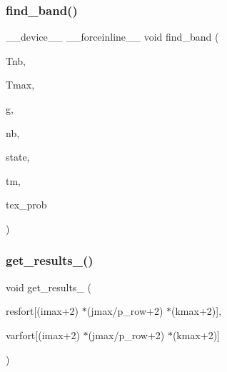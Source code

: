 \subsubsection{\texorpdfstring{find\+\_\+band()}{find\_band()}}
{\footnotesize\ttfamily \+\_\+\+\_\+device\+\_\+\+\_\+ \+\_\+\+\_\+forceinline\+\_\+\+\_\+ void find\+\_\+band (\begin{DoxyParamCaption}\item[{\hyperlink{param_8h_a5f097c9f3873af7be7fc156e6a06ca5e}{myfloat} $\ast$}]{Tnb,  }\item[{\hyperlink{param_8h_a5f097c9f3873af7be7fc156e6a06ca5e}{myfloat}}]{Tmax,  }\item[{int $\ast$}]{g,  }\item[{int $\ast$}]{nb,  }\item[{curand\+State\+\_\+t $\ast$}]{state,  }\item[{int}]{tm,  }\item[{cuda\+Texture\+Object\+\_\+t $\ast$}]{tex\+\_\+prob }\end{DoxyParamCaption})}

\mbox{\label{mc__gpu_8cu_afd9f6194553240239ec004db3c16acec}} 
\subsubsection{\texorpdfstring{get\+\_\+results\+\_\+()}{get\_results\_()}}
{\footnotesize\ttfamily void get\+\_\+results\+\_\+ (\begin{DoxyParamCaption}\item[{\hyperlink{param_8h_a8864e4d26f8f44fed5d0ae3d4f9e3c4a}{myfloatF}}]{resfort\mbox{[}(imax+2) $\ast$(jmax/p\+\_\+row+2) $\ast$(kmax+2)\mbox{]},  }\item[{\hyperlink{param_8h_a8864e4d26f8f44fed5d0ae3d4f9e3c4a}{myfloatF}}]{varfort\mbox{[}(imax+2) $\ast$(jmax/p\+\_\+row+2) $\ast$(kmax+2)\mbox{]} }\end{DoxyParamCaption})}

\mbox{\label{mc__gpu_8cu_a69a74cd79ab6ec3f9048693e61fc31e4}} 
